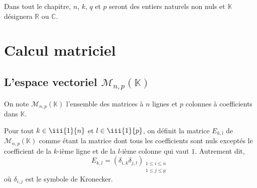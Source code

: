 \documentclass[french,11pt,twoside]{VcCours}
\begin{document}

\tableofcontents
\separationTitre


Dans tout le chapitre, $n$, $k$, $q$ et $p$ seront des entiers naturels non nuls et $\mathbb{K}$ désignera $\mathbb{R}$ ou $\mathbb{C}$.

\section{Calcul matriciel}
\subsection{L'espace vectoriel $\mathcal{M}_{n,p}(\mathbb{K})$}

On note $\mathcal{M}_{n,p}(\mathbb{K})$ l'ensemble des matrices à $n$ lignes et $p$ colonnes à coefficients dans $\mathbb{K}$.
%
%
%
%
%
%

\medskip

Pour tout $k\in \iii{1}{n}$ et $ l \in \iii{1}{p}$, on définit la matrice $E_{k,l}$ de $\mathcal{M}_{n,p}( \mathbb{K})$ comme étant la matrice dont tous les coefficients sont nuls exceptés le coefficient de la $k$-ième ligne et de la $l$-ième colonne qui vaut $1$. Autrement dit,
$$ E_{k,l} = ( \delta_{i,k} \delta_{j,l})_{\substack{1 \leq i \leq n \\ 1 \leq j \leq p}}$$
où $\delta_{i,j}$ est le symbole de Kronecker.
\end{document}
